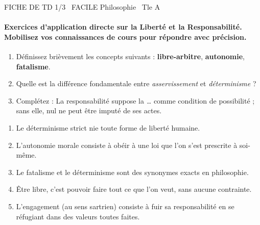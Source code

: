 \documentclass[11pt]{article}
\begin{document}
\begin{tcolorbox}[enhanced,colback=popink,colframe=popink,arc=10pt,boxrule=0pt,left=12pt,right=12pt,top=9pt,bottom=9pt]
{\color{white}\popxbold\small FICHE DE TD 1/3 \textbullet\ FACILE \hfill Philosophie \textbullet\ Tle A\par}
\end{tcolorbox}
\vspace{4pt}

\paragraph{Exercices d'application directe sur la Liberté et la Responsabilité. Mobilisez vos connaissances de cours pour répondre avec précision.}

\begin{exercice}
\begin{enumerate}
    \item Définissez brièvement les concepts suivants : \textbf{libre-arbitre}, \textbf{autonomie}, \textbf{fatalisme}.
    \item Quelle est la différence fondamentale entre \textit{asservissement} et \textit{déterminisme} ?
    \item Complétez : La responsabilité suppose la \textit{\dots} comme condition de possibilité ; sans elle, nul ne peut être imputé de ses actes.
\end{enumerate}
\end{exercice}

\begin{exercice}
\begin{enumerate}
    \item Le déterminisme strict nie toute forme de liberté humaine.
    \item L'autonomie morale consiste à obéir à une loi que l'on s'est prescrite à soi-même.
    \item Le fatalisme et le déterminisme sont des synonymes exacts en philosophie.
    \item Être libre, c'est pouvoir faire tout ce que l'on veut, sans aucune contrainte.
    \item L'engagement (au sens sartrien) consiste à fuir sa responsabilité en se réfugiant dans des valeurs toutes faites.
\end{enumerate}
\end{exercice}
\end{document}
